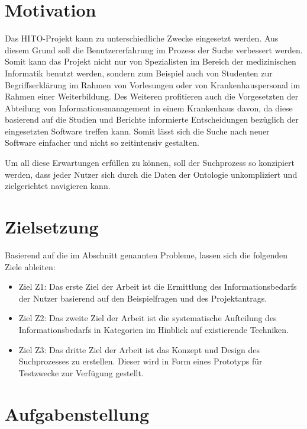 \section{Motivation}\label{sec:motivation}

Das HITO-Projekt kann zu unterschiedliche Zwecke eingesetzt werden. Aus diesem Grund soll die Benutzererfahrung im Prozess der Suche verbessert werden. Somit kann das Projekt nicht nur von Spezialisten im Bereich der medizinischen Informatik benutzt werden, sondern zum Beispiel auch von Studenten zur Begriffserklärung im Rahmen von Vorlesungen oder von Krankenhauspersonal im Rahmen einer Weiterbildung. Des Weiteren profitieren auch die Vorgesetzten der Abteilung von Informationsmanagement in einem Krankenhaus davon, da diese basierend auf die Studien und Berichte informierte Entscheidungen bezüglich der eingesetzten Software treffen kann. Somit lässt sich die Suche nach neuer Software einfacher und nicht so zeitintensiv gestalten.

Um all diese Erwartungen erfüllen zu können, soll der Suchprozess so konzipiert werden, dass jeder Nutzer sich durch die Daten der Ontologie unkompliziert und zielgerichtet navigieren kann.

\section{Zielsetzung}\label{sec:zielsetzung}

Basierend auf die im Abschnitt  genannten Probleme, lassen sich die folgenden Ziele ableiten:

\begin{itemize}
\item Ziel Z1: Das erste Ziel der Arbeit ist die Ermittlung des Informationsbedarfs der Nutzer basierend auf den Beispielfragen und des Projektantrags. 
\item Ziel Z2: Das zweite Ziel der Arbeit ist die systematische Aufteilung des Informationsbedarfs in Kategorien im Hinblick auf existierende Techniken.
\item Ziel Z3: Das dritte Ziel der Arbeit ist das Konzept und Design des Suchprozesses zu erstellen. Dieser wird in Form eines Prototyps für Testzwecke zur Verfügung gestellt.
\end{itemize}

\section{Aufgabenstellung}\label{sec:aufgabenstellung}

